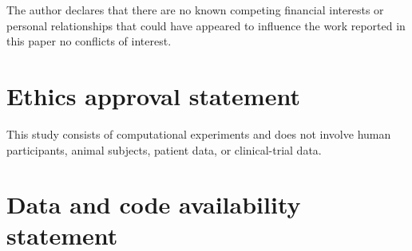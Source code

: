 \documentclass[AMA,Times1COL]{WileyNJDv5} %
\providecommand{\DIFadd}[1]{{\protect\color{blue} \sf #1}} %
\providecommand{\DIFdel}[1]{{\protect\color{red} \scriptsize #1}} %
\providecommand{\DIFaddbegin}{} %
\providecommand{\DIFaddend}{} %
\providecommand{\DIFdelbegin}{} %
\providecommand{\DIFdelend}{} %
\begin{document}
The author declares \DIFdelbegin \DIFdel{that there are no known competing financial interests or personal
relationships that could have appeared to influence the work reported in this paper}\DIFdelend \DIFaddbegin \DIFadd{no conflicts of interest}\DIFaddend .

\DIFdelbegin \section*{\DIFdel{Ethics approval statement}}
\DIFdelend \DIFaddbegin {}
\DIFaddend 

This study consists of computational experiments and does not involve human
participants, animal subjects, patient data, or clinical-trial data.

\DIFdelbegin \section*{\DIFdel{Data and code availability statement}}
\DIFdelend \DIFaddbegin {}
\DIFaddend 
\end{document}
